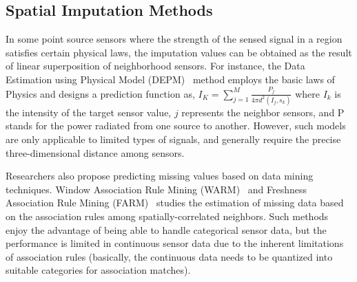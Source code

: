 \subsection{Spatial Imputation Methods}
In some point source sensors where the strength of the sensed signal in a region satisfies certain physical laws, the imputation values can be obtained as the result of linear superposition of neighborhood sensors.
For instance, the Data Estimation using Physical Model (DEPM)~\cite{li2008data} method employs the basic laws of Physics and 
designs a prediction function as,  
$I_K =\sum_{j=1}^M\frac{P_j}{4\pi d^2(I_j,s_k)}$
where $I_k$ is the intensity of the target sensor value, $j$ represents the neighbor sensors, and P stands for the power radiated from one source to another. 
However, such models are only applicable to limited types of signals, and generally require the precise three-dimensional distance among sensors.

Researchers also propose predicting missing values based on data mining techniques. Window Association Rule Mining (WARM)~\cite{le2005estimating} and Freshness Association Rule Mining (FARM)~\cite{Gruenwald:FARM} studies the estimation of missing data based on the association rules among spatially-correlated neighbors. 
Such methods enjoy the advantage of being able to handle categorical sensor data, but the performance is limited in continuous sensor data due to the inherent limitations of association rules (basically, the continuous data needs to be quantized into suitable
categories for association matches).

